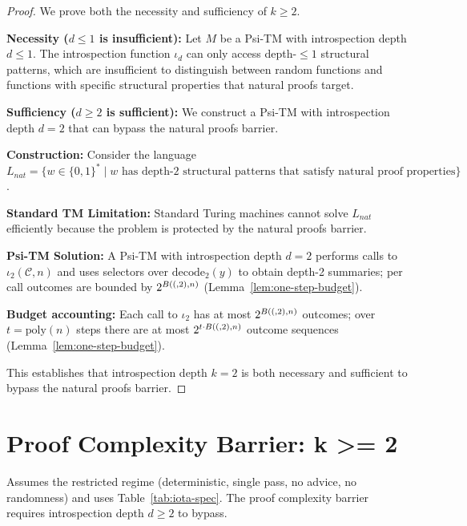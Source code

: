 \begin{proof}
We prove both the necessity and sufficiency of $k \geq 2$.

\textbf{Necessity ($d \le 1$ is insufficient):}
Let $M$ be a Psi-TM with introspection depth $d \leq 1$. The introspection function $\iota_d$ can only access depth-$\leq 1$ structural patterns, which are insufficient to distinguish between random functions and functions with specific structural properties that natural proofs target.

\textbf{Sufficiency ($d \ge 2$ is sufficient):}
We construct a Psi-TM with introspection depth $d = 2$ that can bypass the natural proofs barrier.

\textbf{Construction:}
Consider the language $L_{nat} = \{w \in \{0,1\}^* \mid w \text{ has depth-2 structural patterns that satisfy natural proof properties}\}$.

\textbf{Standard TM Limitation:}
Standard Turing machines cannot solve $L_{nat}$ efficiently because the problem is protected by the natural proofs barrier.

\textbf{Psi-TM Solution:}
A Psi-TM with introspection depth $d = 2$ performs calls to $\iota_2(\mathcal{C},n)$ and uses selectors over $\mathrm{decode}_2(y)$ to obtain depth-2 summaries; per call outcomes are bounded by $2^{B((,2),n)}$ (Lemma~\ref{lem:one-step-budget}).

\textbf{Budget accounting:}
Each call to $\iota_2$ has at most $2^{B((,2),n)}$ outcomes; over $t=\mathrm{poly}(n)$ steps there are at most $2^{t\cdot B((,2),n)}$ outcome sequences (Lemma~\ref{lem:one-step-budget}).

This establishes that introspection depth $k = 2$ is both necessary and sufficient to bypass the natural proofs barrier.
\end{proof}

\section{Proof Complexity Barrier: k >= 2}

\begin{theorem}
Assumes the restricted regime (deterministic, single pass, no advice, no randomness) and uses Table~\ref{tab:iota-spec}.
The proof complexity barrier requires introspection depth $d \geq 2$ to bypass.
\end{theorem}

